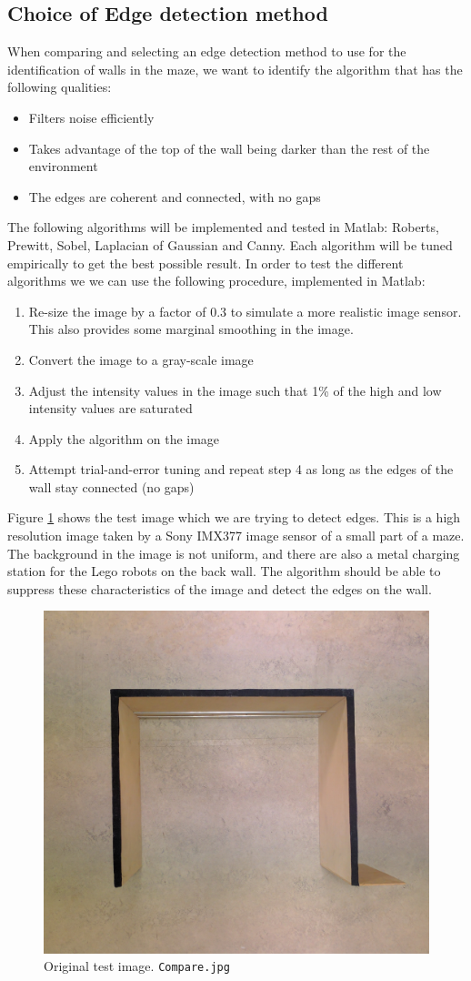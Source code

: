 \newpage
\subsection{Choice of Edge detection method}
\label{choice}
When comparing and selecting an edge detection method to use for the identification of walls in the maze, we want to identify the algorithm that has the following qualities:
\begin{itemize}
\item Filters noise efficiently
\item Takes advantage of the top of the wall being darker than the rest of the environment
\item The edges are coherent and connected, with no gaps
\end{itemize}
The following algorithms will be implemented and tested in Matlab: Roberts, Prewitt, Sobel, Laplacian of Gaussian and Canny. Each algorithm will be tuned empirically to get the best possible result. In order to test the different algorithms we we can use the following procedure, implemented in Matlab:
\begin{enumerate}
\item Re-size the image by a factor of $0.3$ to simulate a more realistic image sensor. This also provides some marginal smoothing in the image.
\item Convert the image to a gray-scale image
\item Adjust the intensity values in the image such that 1\% of the high and low intensity values are saturated
\item Apply the algorithm on the image
\item Attempt trial-and-error tuning and repeat step 4 as long as the edges of the wall stay connected (no gaps)
\end{enumerate}
Figure \ref{fig:testimage} shows the test image which we are trying to detect edges. This is a high resolution image taken by a Sony IMX377 image sensor \cite{cam} of a small part of a maze. The background in the image is not uniform, and there are also a metal charging station for the Lego robots on the back wall. The algorithm should be able to suppress these characteristics of the image and detect the edges on the wall.
\begin{figure}[H]
\centering
  \includegraphics[width=.7\linewidth]{fig/Compare}
  \caption{Original test image. \texttt{Compare.jpg}}
  \label{fig:testimage}
\end{figure}
